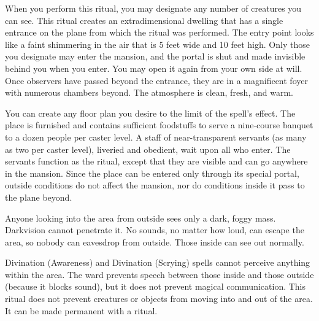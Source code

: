 \spellspecial When you perform this ritual, you may designate any number of creatures you can see.
\spellline
\spelleffect This ritual creates an extradimensional dwelling that has a single entrance on the plane from which the ritual was performed. The entry point looks like a faint shimmering in the air that is 5 feet wide and 10 feet high. Only those you designate may enter the mansion, and the portal is shut and made invisible behind you when you enter. You may open it again from your own side at will. Once observers have passed beyond the entrance, they are in a magnificent foyer with numerous chambers beyond. The atmosphere is clean, fresh, and warm.
\par You can create any floor plan you desire to the limit of the spell's effect. The place is furnished and contains sufficient foodstuffs to serve a nine-course banquet to a dozen people per caster level. A staff of near-transparent servants (as many as two per caster level), liveried and obedient, wait upon all who enter. The servants function as the  ritual, except that they are visible and can go anywhere in the mansion.
\spellnotes Since the place can be entered only through its special portal, outside conditions do not affect the mansion, nor do conditions inside it pass to the plane beyond.

\spelldur{\durext \dismissable}
\spellline
\spelleffect Anyone looking into the area from outside sees only a dark, foggy mass. Darkvision cannot penetrate it. No sounds, no matter how loud, can escape the area, so nobody can eavesdrop from outside. Those inside can see out normally.

Divination (Awareness) and Divination (Scrying) spells cannot perceive anything within the area. The ward prevents speech between those inside and those outside (because it blocks sound), but it does not prevent magical communication.
\spellnotes This ritual does not prevent creatures or objects from moving into and out of the area. It can be made permanent with a  ritual.

